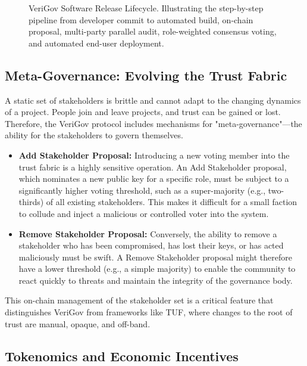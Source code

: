 \documentclass{article}
\begin{document}
\begin{figure}[H]
  \caption{VeriGov Software Release Lifecycle. Illustrating the step-by-step pipeline from developer commit to automated build, on-chain proposal, multi-party parallel audit, role-weighted consensus voting, and automated end-user deployment.}
  \label{fig:lifecycle}
\end{figure}


\subsection{Meta-Governance: Evolving the Trust Fabric}

A static set of stakeholders is brittle and cannot adapt to the changing dynamics of a project. People join and leave projects, and trust can be gained or lost. Therefore, the VeriGov protocol includes mechanisms for "meta-governance"---the ability for the stakeholders to govern themselves.

\begin{itemize}
\item \textbf{Add Stakeholder Proposal:} Introducing a new voting member into the trust fabric is a highly sensitive operation. An Add Stakeholder proposal, which nominates a new public key for a specific role, must be subject to a significantly higher voting threshold, such as a super-majority (e.g., two-thirds) of all existing stakeholders. This makes it difficult for a small faction to collude and inject a malicious or controlled voter into the system.
\item \textbf{Remove Stakeholder Proposal:} Conversely, the ability to remove a stakeholder who has been compromised, has lost their keys, or has acted maliciously must be swift. A Remove Stakeholder proposal might therefore have a lower threshold (e.g., a simple majority) to enable the community to react quickly to threats and maintain the integrity of the governance body.~\cite{wright2015decentralized}
\end{itemize}

This on-chain management of the stakeholder set is a critical feature that distinguishes VeriGov from frameworks like TUF, where changes to the root of trust are manual, opaque, and off-band.

\subsection{Tokenomics and Economic Incentives}
\end{document}
